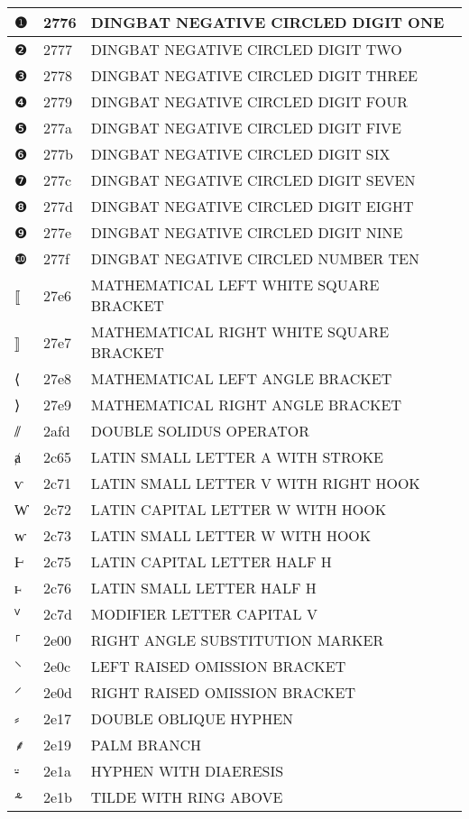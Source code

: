 \documentclass[12pt,letterpaper,openany]{book}
\begin{document}
\begin{center}
\begin{supertabular}{|m{0.25in}|m{0.5in}|m{4in}|}
❶ & 2776 & DINGBAT NEGATIVE CIRCLED DIGIT ONE\\\hline
❷ & 2777 & DINGBAT NEGATIVE CIRCLED DIGIT TWO\\\hline
❸ & 2778 & DINGBAT NEGATIVE CIRCLED DIGIT THREE\\\hline
❹ & 2779 & DINGBAT NEGATIVE CIRCLED DIGIT FOUR\\\hline
❺ & 277a & DINGBAT NEGATIVE CIRCLED DIGIT FIVE\\\hline
❻ & 277b & DINGBAT NEGATIVE CIRCLED DIGIT SIX\\\hline
❼ & 277c & DINGBAT NEGATIVE CIRCLED DIGIT SEVEN\\\hline
❽ & 277d & DINGBAT NEGATIVE CIRCLED DIGIT EIGHT\\\hline
❾ & 277e & DINGBAT NEGATIVE CIRCLED DIGIT NINE\\\hline
❿ & 277f & DINGBAT NEGATIVE CIRCLED NUMBER TEN\\\hline
⟦ & 27e6 & MATHEMATICAL LEFT WHITE SQUARE BRACKET\\\hline
⟧ & 27e7 & MATHEMATICAL RIGHT WHITE SQUARE BRACKET\\\hline
⟨ & 27e8 & MATHEMATICAL LEFT ANGLE BRACKET\\\hline
⟩ & 27e9 & MATHEMATICAL RIGHT ANGLE BRACKET\\\hline
⫽ & 2afd & DOUBLE SOLIDUS OPERATOR\\\hline
ⱥ & 2c65 & LATIN SMALL LETTER A WITH STROKE\\\hline
ⱱ & 2c71 & LATIN SMALL LETTER V WITH RIGHT HOOK\\\hline
Ⱳ & 2c72 & LATIN CAPITAL LETTER W WITH HOOK\\\hline
ⱳ & 2c73 & LATIN SMALL LETTER W WITH HOOK\\\hline
Ⱶ & 2c75 & LATIN CAPITAL LETTER HALF H\\\hline
ⱶ & 2c76 & LATIN SMALL LETTER HALF H\\\hline
ⱽ & 2c7d & MODIFIER LETTER CAPITAL V\\\hline
⸀ & 2e00 & RIGHT ANGLE SUBSTITUTION MARKER\\\hline
⸌ & 2e0c & LEFT RAISED OMISSION BRACKET\\\hline
⸍ & 2e0d & RIGHT RAISED OMISSION BRACKET\\\hline
⸗ & 2e17 & DOUBLE OBLIQUE HYPHEN\\\hline
⸙ & 2e19 & PALM BRANCH\\\hline
⸚ & 2e1a & HYPHEN WITH DIAERESIS\\\hline
⸛ & 2e1b & TILDE WITH RING ABOVE\\\hline

\end{supertabular}
\end{center}
\end{document}
